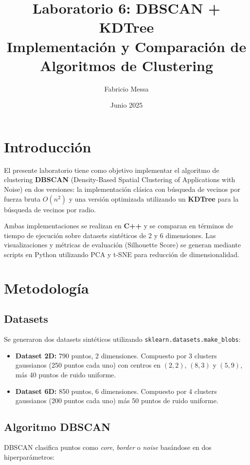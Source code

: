 \documentclass[12pt,a4paper]{article}
\title{\textbf{Laboratorio 6: DBSCAN + KDTree}\\ 
       \large Implementación y Comparación de Algoritmos de Clustering}
\author{Fabricio Messa}
\date{Junio 2025}
\begin{document}
\maketitle
\tableofcontents
\newpage

\section{Introducción}

El presente laboratorio tiene como objetivo implementar el algoritmo de clustering \textbf{DBSCAN} (Density-Based Spatial Clustering of Applications with Noise) en dos versiones: la implementación clásica con búsqueda de vecinos por fuerza bruta $O(n^2)$ y una versión optimizada utilizando un \textbf{KDTree} para la búsqueda de vecinos por radio.

Ambas implementaciones se realizan en \textbf{C++} y se comparan en términos de tiempo de ejecución sobre datasets sintéticos de 2 y 6 dimensiones. Las visualizaciones y métricas de evaluación (Silhouette Score) se generan mediante scripts en Python utilizando PCA y t-SNE para reducción de dimensionalidad.

\section{Metodología}

\subsection{Datasets}
Se generaron dos datasets sintéticos utilizando \texttt{sklearn.datasets.make\_blobs}:

\begin{itemize}
    \item \textbf{Dataset 2D:} 790 puntos, 2 dimensiones. Compuesto por 3 clusters gaussianos (250 puntos cada uno) con centros en $(2,2)$, $(8,3)$ y $(5,9)$, más 40 puntos de ruido uniforme.
    \item \textbf{Dataset 6D:} 850 puntos, 6 dimensiones. Compuesto por 4 clusters gaussianos (200 puntos cada uno) más 50 puntos de ruido uniforme.
\end{itemize}

\subsection{Algoritmo DBSCAN}
DBSCAN clasifica puntos como \textit{core}, \textit{border} o \textit{noise} basándose en dos hiperparámetros:
\end{document}
